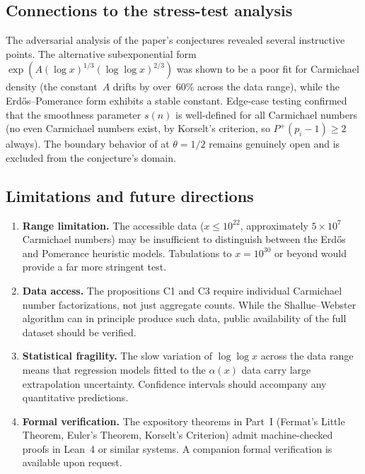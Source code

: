 \documentclass[12pt]{amsart}
\theoremstyle{plain}
\theoremstyle{definition}
\theoremstyle{remark}
\newcommand{\Pp}{P^{+}}
\begin{document}
\subsection*{Connections to the stress-test analysis}

The adversarial analysis of the paper's conjectures revealed several
instructive points.  The alternative subexponential form
$\exp(A(\log x)^{1/3}(\log\log x)^{2/3})$ was shown to be a poor fit
for Carmichael density (the constant~$A$ drifts by over~$60\%$ across
the data range), while the Erd\H{o}s--Pomerance form exhibits a
stable constant.  Edge-case testing confirmed that the smoothness
parameter $s(n)$ is well-defined for all Carmichael numbers (no even
Carmichael numbers exist, by Korselt's criterion, so $\Pp(p_i-1)\ge 2$
always).  The boundary behavior of  at $\theta=1/2$
remains genuinely open and is excluded from the conjecture's domain.

\subsection*{Limitations and future directions}

\begin{enumerate}
\item \textbf{Range limitation.}  The accessible data ($x\le 10^{22}$,
  approximately $5\times 10^{7}$ Carmichael numbers) may be
  insufficient to distinguish between the Erd\H{o}s and Pomerance
  heuristic models.  Tabulations to $x=10^{30}$ or beyond would
  provide a far more stringent test.

\item \textbf{Data access.}  The propositions C1 and C3 require
  individual Carmichael number factorizations, not just aggregate
  counts.  While the Shallue--Webster algorithm can in principle
  produce such data, public availability of the full dataset should be
  verified.

\item \textbf{Statistical fragility.}  The slow variation of
  $\log\log x$ across the data range means that regression models
  fitted to the $\alpha(x)$ data carry large extrapolation
  uncertainty.  Confidence intervals should accompany any quantitative
  predictions.

\item \textbf{Formal verification.}  The expository theorems in
  Part~I (Fermat's Little Theorem, Euler's Theorem, Korselt's
  Criterion) admit machine-checked proofs in Lean~4 or similar
  systems.  A companion formal verification is available upon request.
\end{enumerate}
\end{document}
